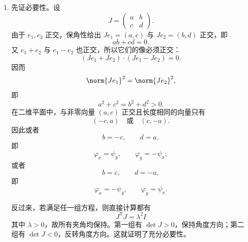 \begin{xsolution}
\begin{enumerate}[label=(\arabic*)]
  \item 先证必要性。设
  \[
    J=\begin{pmatrix}a&b\\c&d\end{pmatrix}.
  \]
  由于 $e_1,e_2$ 正交，保角性给出 $Je_1=(a,c)$ 与 $Je_2=(b,d)$ 正交，即
  \[
    ab+cd=0.
  \]
  又 $e_1+e_2$ 与 $e_1-e_2$ 也正交，所以它们的像必须正交：
  \[
    (Je_1+Je_2)\cdot(Je_1-Je_2)=0.
  \]
  因而
  \[
    \norm{Je_1}^2=\norm{Je_2}^2,
  \]
  即
  \[
    a^2+c^2=b^2+d^2>0.
  \]
  在二维平面中，与非零向量 $(a,c)$ 正交且长度相同的向量只有
  \[
    (-c,a)
    \quad\text{或}\quad
    (c,-a).
  \]
  因此或者
  \[
    b=-c,
    \qquad d=a,
  \]
  即
  \[
    \varphi_x=\psi_y,
    \qquad
    \varphi_y=-\psi_x;
  \]
  或者
  \[
    b=c,
    \qquad d=-a,
  \]
  即
  \[
    \varphi_x=-\psi_y,
    \qquad
    \varphi_y=\psi_x.
  \]

  反过来，若满足任一组方程，则直接计算都有
  \[
    J^{\mathsf T}J=\lambda^2I
  \]
  其中 $\lambda>0$，故所有夹角均保持。第一组有 $\det J>0$，保持角度方向；第二组有 $\det J<0$，反转角度方向。这就证明了充分必要性。
\end{enumerate}
\end{xsolution}


